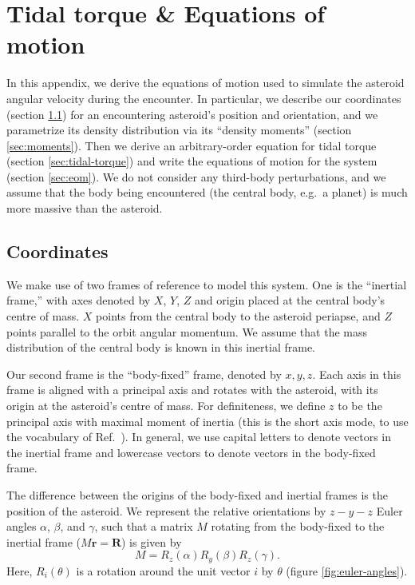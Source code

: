 


\appendix

\section{Tidal torque \& Equations of motion}
\label{app:eom}

In this appendix, we derive the equations of motion used to simulate the asteroid angular velocity during the encounter. In particular, we describe our coordinates (section \ref{sec:coordinates}) for an encountering asteroid's position and orientation, and we parametrize its density distribution via its ``density moments'' (section \ref{sec:moments}). Then we derive an arbitrary-order equation for tidal torque (section \ref{sec:tidal-torque}) and write the equations of motion for the system (section \ref{sec:eom}). We do not consider any third-body perturbations, and we assume that the body being encountered (the central body, e.g.~a planet) is much more massive than the asteroid.

\subsection{Coordinates}
\label{sec:coordinates}

We make use of two frames of reference to model this system. One is the ``inertial frame,'' with axes denoted by $\unit{X}$, $\unit{Y}$, $\unit{Z}$ and origin placed at the central body's centre of mass. $\unit{X}$ points from the central body to the asteroid periapse, and $\unit{Z}$ points parallel to the orbit angular momentum. We assume that the mass distribution of the central body is known in this inertial frame.

Our second frame is the ``body-fixed'' frame, denoted by $\unit{x}, \unit{y}, \unit{z}$. Each axis in this frame is aligned with a principal axis and rotates with the asteroid, with its origin at the asteroid's centre of mass. For definiteness, we define $\unit{z}$ to be the principal axis with maximal moment of inertia (this is the short axis mode, to use the vocabulary of Ref.~\cite{kaasalainen2001interpretation}). In general, we use capital letters to denote vectors in the inertial frame and lowercase vectors to denote vectors in the body-fixed frame.

The difference between the origins of the body-fixed and inertial frames is the position of the asteroid. We represent the relative orientations by $z-y-z$ Euler angles $\alpha$, $\beta$, and $\gamma$, such that a matrix $M$ rotating from the body-fixed to the inertial frame ($M\bm{r} = \bm{R}$) is given by
\begin{equation}
M = R_z(\alpha) R_y(\beta) R_z(\gamma).
\label{eqn:euler-angles}
\end{equation}
Here, $R_i(\theta)$ is a rotation around the unit vector $i$ by $\theta$ (figure \ref{fig:euler-angles}).

